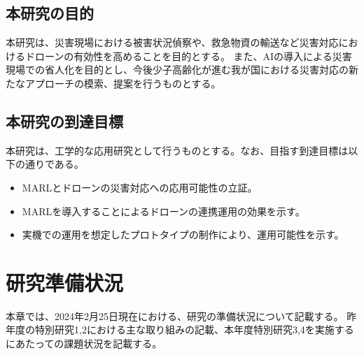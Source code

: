 \documentclass{article}[jsarticle]
\begin{document}
\subsection{本研究の目的}
本研究は、災害現場における被害状況偵察や、救急物資の輸送など災害対応におけるドローンの有効性を高めることを目的とする。
また、AIの導入による災害現場での省人化を目的とし、今後少子高齢化が進む我が国における災害対応の新たなアプローチの模索、提案を行うものとする。
\subsection{本研究の到達目標}
本研究は、工学的な応用研究として行うものとする。なお、目指す到達目標は以下の通りである。
\begin{itemize}
    \item MARLとドローンの災害対応への応用可能性の立証。
    \item MARLを導入することによるドローンの連携運用の効果を示す。
    \item 実機での運用を想定したプロトタイプの制作により、運用可能性を示す。
\end{itemize}

\section{研究準備状況}
本章では、2024年2月25日現在における、研究の準備状況について記載する。
昨年度の特別研究1,2における主な取り組みの記載、本年度特別研究3,4を実施するにあたっての課題状況を記載する。
\end{document}
